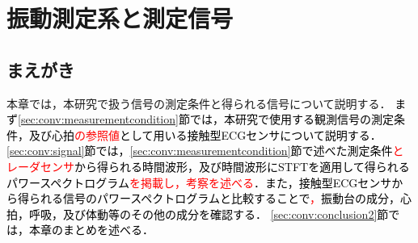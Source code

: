 \chapter{振動測定系と測定信号}
\label{chap:measurementstructsig}

\section{まえがき}
本章では，本研究で扱う信号の測定条件と得られる信号について説明する．
\textcolor{black}{まず\ref{sec:conv:measurementcondition}節では，本研究で使用する観測信号の測定条件，及び心拍\textcolor{red}{の参照値}として用いる接触型ECGセンサについて説明する．
\ref{sec:conv:signal}節では，\ref{sec:conv:measurementcondition}節で述べた測定条件\textcolor{red}{とレーダセンサ}から得られる時間波形，及び時間波形にSTFTを適用して得られるパワースペクトログラム\textcolor{red}{を掲載し，考察を述べる}．また，接触型ECGセンサから得られる信号のパワースペクトログラムと比較することで\textcolor{red}{，}振動台の成分，心拍，呼吸，及び体動等のその他の成分を確認する．
\ref{sec:conv:conclusion2}節では，本章のまとめを述べる．}

